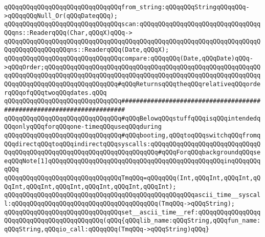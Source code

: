 \newline
\verb|qQQqqQQqqQQqqQQqqQQqqQQqqQQqqQQqfrom_string:qQQqqQQqStringqQQqqQQq->qQQqqQQqNull_Or(qQQqDateqQQq);|\newline
\newline
\verb|qQQqqQQqqQQqqQQqqQQqqQQqqQQqqQQqscan:qQQqqQQqqQQqqQQqqQQqqQQqqQQqqQQqqQQqns::ReaderqQQq(Char,qQQqX)qQQq->|\newline
\verb|qQQqqQQqqQQqqQQqqQQqqQQqqQQqqQQqqQQqqQQqqQQqqQQqqQQqqQQqqQQqqQQqqQQqqQQqqQQqqQQqqQQqqQQqns::ReaderqQQq(Date,qQQqX);|\newline
\newline
\verb|qQQqqQQqqQQqqQQqqQQqqQQqqQQqqQQqcompare:qQQqqQQq(Date,qQQqDate)qQQq->qQQqOrder;qQQqqQQqqQQqqQQqqQQqqQQqqQQqqQQqqQQqqQQqqQQqqQQqqQQqqQQqqQQqqQQqqQQqqQQqqQQqqQQqqQQqqQQqqQQqqQQqqQQqqQQqqQQqqQQqqQQqqQQqqQQqqQQqqQQqqQQqqQQqqQQqqQQqqQQqqQQqqQQq#qQQqReturnsqQQqtheqQQqrelativeqQQqorderqQQqofqQQqtwoqQQqdates.qQQq|\newline
\newline
\newline
\verb|qQQqqQQqqQQqqQQqqQQqqQQqqQQqqQQq#######################################################################|\newline
\verb|qQQqqQQqqQQqqQQqqQQqqQQqqQQqqQQq#qQQqBelowqQQqstuffqQQqisqQQqintendedqQQqonlyqQQqforqQQqone-timeqQQquseqQQqduring|\newline
\verb|qQQqqQQqqQQqqQQqqQQqqQQqqQQqqQQq#qQQqbooting,qQQqtoqQQqswitchqQQqfromqQQqdirectqQQqtoqQQqindirectqQQqsyscalls:qQQqqQQqqQQqqQQqqQQqqQQqqQQqqQQqqQQqqQQqqQQqqQQqqQQqqQQqqQQqqQQqqQQqqQQq#qQQqForqQQqbackgroundqQQqseeqQQqNote[1]qQQqqQQqqQQqqQQqqQQqqQQqqQQqqQQqqQQqqQQqqQQqqQQqinqQQqqQQqqQQq|\newline
\newline
\verb|qQQqqQQqqQQqqQQqqQQqqQQqqQQqqQQqTmqQQq=qQQqqQQq(Int,qQQqInt,qQQqInt,qQQqInt,qQQqInt,qQQqInt,qQQqInt,qQQqInt,qQQqInt);|\newline
\newline
\verb|qQQqqQQqqQQqqQQqqQQqqQQqqQQqqQQqqQQqqQQqqQQqqQQqqQQqascii_time__syscall:qQQqqQQqqQQqqQQqqQQqqQQqqQQqqQQqqQQqqQQq(TmqQQq->qQQqString);|\newline
\verb|qQQqqQQqqQQqqQQqqQQqqQQqqQQqqQQqset__ascii_time__ref:qQQqqQQqqQQqqQQqqQQqqQQqqQQqqQQqqQQqqQQqqQQq(qQQq{qQQqlib_name:qQQqString,qQQqfun_name:qQQqString,qQQqio_call:qQQqqQQq(TmqQQq->qQQqString)qQQq}|\newline
